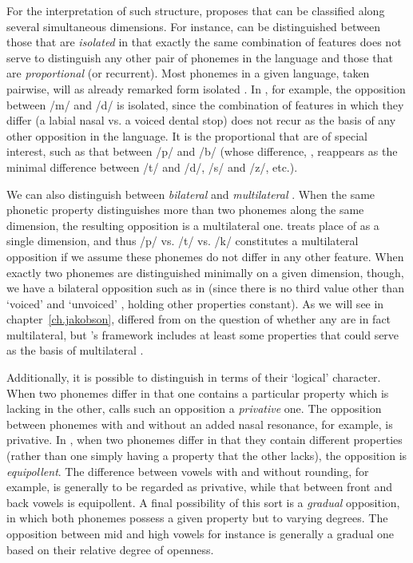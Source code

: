 For the interpretation of such structure, {\Trubetzkoy} proposes that
 can be classified along several simultaneous
dimensions. For instance,  can be distinguished between
those that are \emph{isolated} in that exactly the same combination of
features does not serve to distinguish any other pair of phonemes in
the language and those that are \emph{proportional} (or
recurrent). Most phonemes in a given language, taken pairwise, will as
already remarked form isolated . In , for example,
the opposition between /m/ and /d/ is isolated, since the combination
of features in which they differ (a labial nasal vs. a voiced dental
stop) does not recur as the basis of any other opposition in the
language. It is the proportional  that are of special
interest, such as that between  /p/ and /b/ (whose difference,
, reappears as the minimal difference between /t/ and /d/, /s/
and /z/, etc.).

We can also distinguish between \emph{bilateral} and
\emph{multilateral} . When the same phonetic property
distinguishes more than two phonemes along the same dimension, the
resulting opposition is a multilateral one. {\Trubetzkoy} treats place of
 as a single dimension, and thus /p/ vs. /t/ vs. /k/
constitutes a multilateral opposition if we assume these phonemes do
not differ in any other feature. When exactly two phonemes are
distinguished minimally on a given dimension, though, we have a
bilateral opposition such as  in  (since there is no
third value other than `voiced' and `unvoiced' , holding other
properties constant). As we will see in chapter~\ref{ch.jakobson},
{\Jakobson} differed from {\Trubetzkoy} on the question of whether any
 are in fact multilateral, but {\Trubetzkoy}'s framework
includes at least some properties that could serve as the basis of
multilateral .

Additionally, it is possible to distinguish  in terms of
their `logical' character. When two phonemes differ in that one
contains a particular property which is lacking in the other,
{\Trubetzkoy} calls such an opposition a \emph{privative} one. The
opposition between phonemes with and without an added nasal resonance,
for example, is privative. In , when two phonemes differ in
that they contain different properties (rather than one simply having
a property that the other lacks), the opposition is \emph{equipollent}. The
difference between vowels with and without rounding, for example, is
generally to be regarded as privative, while that between front and
back vowels is equipollent. A final possibility of this sort is a
\emph{gradual} opposition, in which both phonemes possess a given property
but to varying degrees. The opposition between mid and high vowels for
instance is generally a gradual one based on their relative degree of
openness.

